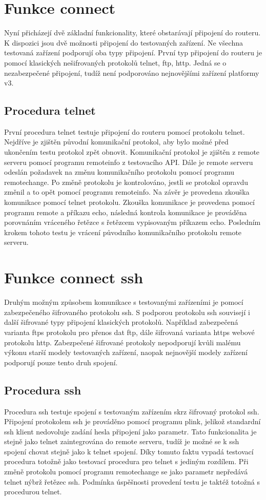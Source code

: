 \section{Funkce connect}
Nyní přicházejí dvě základní funkcionality, které obstarávají připojení do routeru. K dispozici jsou dvě možnosti připojení do testovaných zařízení. Ne všechna testovaná zařízení podporují oba typy připojení. První typ připojení do routeru je pomocí klasických nešifrovaných protokolů telnet, ftp, http. Jedná se o nezabezpečené připojení, tudíž není podporováno nejnovějšími zařízení platformy v3.

\subsection{Procedura telnet}
První procedura telnet testuje připojení do routeru pomocí protokolu telnet. Nejdříve je zjištěn původní komunikační protokol, aby bylo možné před ukončením testu protokol zpět obnovit. Komunikační protokol je zjištěn z remote serveru pomocí programu remoteinfo z testovacího API. Dále je remote serveru odeslán požadavek na změnu komunikačního protokolu pomocí programu remotechange. Po změně protokolu je kontrolováno, jestli se protokol opravdu změnil a to opět pomocí programu remoteinfo. Na závěr je provedena zkouška komunikace pomocí telnet protokolu. Zkouška komunikace je provedena pomocí programu remote a příkazu echo, následná kontrola komunikace je prováděna porovnáním vráceného řetězce s řetězcem vypisovaným příkazem echo. Posledním krokem tohoto testu je vrácení původního komunikačního protokolu remote serveru.

\section{Funkce connect ssh}
Druhým možným způsobem komunikace s testovanými zařízeními je pomocí zabezpečeného šifrovaného protokolu ssh. S podporou protokolu ssh souvisejí i další šifrované typy připojení klasických protokolů. Například zabezpečená varianta ftps protokolu pro přenos dat ftp, dále šifrovaná varianta https webové protokolu http. Zabezpečené šifrované protokoly nepodporují kvůli malému výkonu starší modely testovaných zařízení, naopak nejnovější modely zařízení podporují pouze tento druh spojení.

\subsection{Procedura ssh}
Procedura ssh testuje spojení s testovaným zařízením skrz šifrovaný protokol ssh. Připojení protokolem ssh je prováděno pomocí programu plink, jelikož standardní ssh klient nedovoluje zadání hesla připojení jako parametr. Tato funkcionalita je stejně jako telnet zaintegrována do remote serveru, tudíž je možné se k ssh spojení chovat stejně jako k telnet spojení. Díky tomuto faktu vypadá testovací procedura totožně jako testovací procedura pro telnet s jediným rozdílem. Při změně protokolu pomocí programu remotechange se jako parametr nepředává telnet nýbrž řetězec ssh. Podmínka úspěšnosti provedení testu je taktéž totožná s procedurou telnet.

